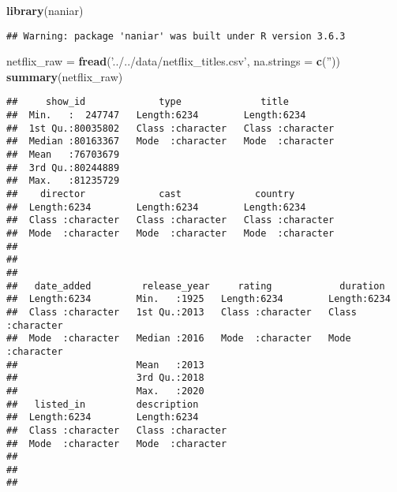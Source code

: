 \documentclass[]{article}
\newenvironment{Shaded}{\begin{snugshade}}{\end{snugshade}}
\newcommand{\DataTypeTok}[1]{\textcolor[rgb]{0.13,0.29,0.53}{#1}}
\newcommand{\KeywordTok}[1]{\textcolor[rgb]{0.13,0.29,0.53}{\textbf{#1}}}
\newcommand{\NormalTok}[1]{#1}
\newcommand{\StringTok}[1]{\textcolor[rgb]{0.31,0.60,0.02}{#1}}
\begin{document}
\begin{Shaded}
\begin{Highlighting}[]
\KeywordTok{library}\NormalTok{(naniar)}
\end{Highlighting}
\end{Shaded}

\begin{verbatim}
## Warning: package 'naniar' was built under R version 3.6.3
\end{verbatim}

\begin{Shaded}
\begin{Highlighting}[]
\NormalTok{netflix_raw =}\StringTok{ }\KeywordTok{fread}\NormalTok{(}\StringTok{'../../data/netflix_titles.csv'}\NormalTok{, }\DataTypeTok{na.strings =} \KeywordTok{c}\NormalTok{(}\StringTok{''}\NormalTok{))}
\KeywordTok{summary}\NormalTok{(netflix_raw)}
\end{Highlighting}
\end{Shaded}

\begin{verbatim}
##     show_id             type              title          
##  Min.   :  247747   Length:6234        Length:6234       
##  1st Qu.:80035802   Class :character   Class :character  
##  Median :80163367   Mode  :character   Mode  :character  
##  Mean   :76703679                                        
##  3rd Qu.:80244889                                        
##  Max.   :81235729                                        
##    director             cast             country         
##  Length:6234        Length:6234        Length:6234       
##  Class :character   Class :character   Class :character  
##  Mode  :character   Mode  :character   Mode  :character  
##                                                          
##                                                          
##                                                          
##   date_added         release_year     rating            duration        
##  Length:6234        Min.   :1925   Length:6234        Length:6234       
##  Class :character   1st Qu.:2013   Class :character   Class :character  
##  Mode  :character   Median :2016   Mode  :character   Mode  :character  
##                     Mean   :2013                                        
##                     3rd Qu.:2018                                        
##                     Max.   :2020                                        
##   listed_in         description       
##  Length:6234        Length:6234       
##  Class :character   Class :character  
##  Mode  :character   Mode  :character  
##                                       
##                                       
## 
\end{verbatim}
\end{document}
